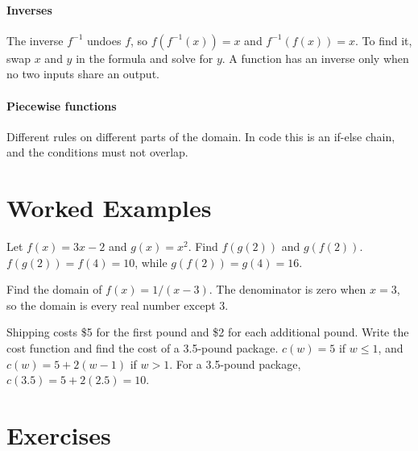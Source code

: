 \paragraph{Inverses} The inverse $f^{-1}$ undoes $f$, so $f(f^{-1}(x)) = x$ and $f^{-1}(f(x)) = x$. To find it, swap $x$ and $y$ in the formula and solve for $y$. A function has an inverse only when no two inputs share an output.

\paragraph{Piecewise functions} Different rules on different parts of the domain. In code this is an if-else chain, and the conditions must not overlap.

\section{Worked Examples}

\begin{example}
Let $f(x) = 3x - 2$ and $g(x) = x^2$. Find $f(g(2))$ and $g(f(2))$.
\solution $f(g(2)) = f(4) = 10$, while $g(f(2)) = g(4) = 16$.
\end{example}

\begin{example}
Find the domain of $f(x) = 1/(x - 3)$.
\solution The denominator is zero when $x = 3$, so the domain is every real number except $3$.
\end{example}

\begin{example}
Shipping costs \$5 for the first pound and \$2 for each additional pound. Write the cost function and find the cost of a 3.5-pound package.
\solution $c(w) = 5$ if $w \le 1$, and $c(w) = 5 + 2(w - 1)$ if $w > 1$. For a 3.5-pound package, $c(3.5) = 5 + 2(2.5) = 10$.
\end{example}

\section{Exercises}

